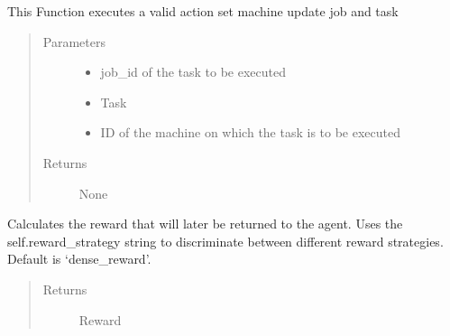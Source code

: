 \documentclass[letterpaper,10pt,english]{sphinxmanual}
\begin{document}
\begin{fulllineitems}
\begin{fulllineitems}
\label{\detokenize{environments:environments.env_tetris_scheduling.Env.execute_action}}
\sphinxAtStartPar
This Function executes a valid action
\sphinxhyphen{} set machine
\sphinxhyphen{} update job and task
\begin{quote}\begin{description}
\item[{Parameters}] \leavevmode\begin{itemize}
\item {} 
\sphinxAtStartPar
{} \textendash{} job\_id of the task to be executed

\item {} 
\sphinxAtStartPar
{} \textendash{} Task

\item {} 
\sphinxAtStartPar
{} \textendash{} ID of the machine on which the task is to be executed

\end{itemize}

\item[{Returns}] \leavevmode
\sphinxAtStartPar
None

\end{description}\end{quote}

\end{fulllineitems}


\begin{fulllineitems}
\label{\detokenize{environments:environments.env_tetris_scheduling.Env.compute_reward}}
\sphinxAtStartPar
Calculates the reward that will later be returned to the agent. Uses the self.reward\_strategy string to
discriminate between different reward strategies. Default is ‘dense\_reward’.
\begin{quote}\begin{description}
\item[{Returns}] \leavevmode
\sphinxAtStartPar
Reward


\end{description}
\end{quote}
\end{fulllineitems}
\end{fulllineitems}
\end{document}
